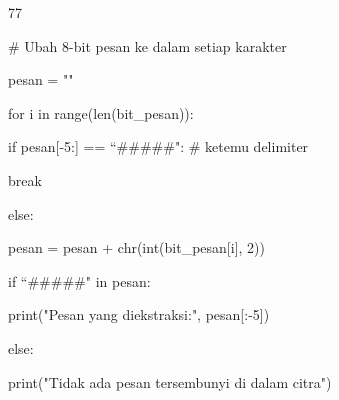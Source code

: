 \documentclass{article}
\begin{document}

77

\# Ubah 8-bit pesan ke dalam setiap karakter   

 pesan = ""    

 for i in range(len(bit\_pesan)):       

   if pesan[-5:] == “\#\#\#\#\#":   \# ketemu delimiter     

      break       

   else:            

      pesan = pesan + chr(int(bit\_pesan[i], 2))         

if “\#\#\#\#\#" in pesan:      

   print("Pesan yang diekstraksi:", pesan[:-5])    

else:       

   print("Tidak ada pesan tersembunyi di dalam citra")
\end{document}
